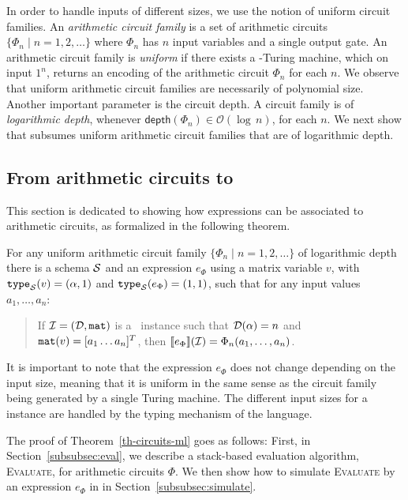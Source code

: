In order to handle inputs of different sizes, we use the notion of uniform circuit families. An \textit{arithmetic circuit family} is a set of arithmetic circuits $\{\Phi_n\mid n=1,2,\ldots\}$ where $\Phi_n$ has $n$ input variables and a single output gate. An arithmetic circuit family is \textit{uniform} if there exists a \logspace-Turing machine,
which on input $1^n$, returns an encoding of the arithmetic circuit $\Phi_n$ for each $n$.
We observe that uniform arithmetic circuit families are necessarily of polynomial size. 
Another important parameter is the circuit depth. A circuit family is of \textit{logarithmic depth}, whenever $\mathsf{depth}(\Phi_n)\in \mathcal{O}(\log\, n)$, for each $n$. We next show that \langfor subsumes uniform arithmetic circuit families that are of logarithmic depth. 


\subsection{From arithmetic circuits to \langfor}\label{subsec:actoformatlang}
This section is dedicated to showing how \langfor expressions can be associated to arithmetic circuits, as formalized
in the following theorem.

\begin{theorem}
\label{th-circuits-ml}
For any uniform arithmetic circuit family $\{\Phi_n\mid n=1,2,\ldots\}$ of logarithmic depth there is a \langfor schema $\mathcal{S}$ and an expression $e_\Phi$ using a matrix variable $v$, with $\texttt{type}_{\mathcal{S}}(v)=(\alpha,1)$ and $\texttt{type}_{\mathcal{S}}(e_\Phi) = (1,1)$, such that for any input values $a_1,\ldots ,a_n$: 
\begin{quote} If $\mathcal{I} = (\mathcal{D},\texttt{mat})$ is a \lang\ instance such that $\mathcal{D}(\alpha) = n$ and $\texttt{mat}(v) = [a_1 \ldots a_n]^T$,
 then $\llbracket e_\Phi \rrbracket(\mathcal{I}) = \Phi_n(a_1,\ldots ,a_n)$.
\end{quote}
\end{theorem}
It is important to note that the expression $e_\Phi$ does not change depending on the input size, meaning that it is uniform in the same sense as the circuit family being generated by a single Turing machine. The different input sizes for a \langfor instance are handled by the typing mechanism of the language. 

The proof of Theorem~\ref{th-circuits-ml} goes as follows: First, in
Section~\ref{subsubsec:eval}, we describe a stack-based evaluation algorithm, \textsc{Evaluate}, for arithmetic circuits $\Phi$. We then show how to simulate  \textsc{Evaluate} by an expression $e_\Phi$ in \langfor in Section~\ref{subsubsec:simulate}. 

